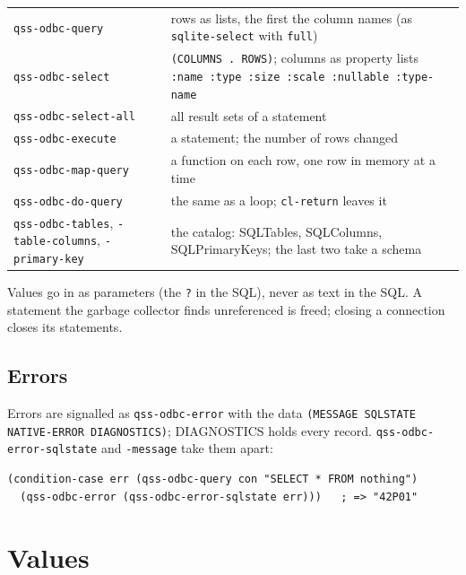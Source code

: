 \documentclass[
  paper=a4, fontsize=11pt, parskip=half, headings=small,
  toc=bibliography, numbers=noenddot, DIV=12
]{scrreprt}
\newcommand{\code}[1]{\texttt{#1}}
\begin{document}
\noindent\begin{tabularx}{\linewidth}{@{}lX@{}}
\toprule
\code{qss-odbc-query} & rows as lists, the first the column names (as \code{sqlite-select} with \code{full}) \\
\code{qss-odbc-select} & \code{(COLUMNS . ROWS)}; columns as property lists \code{:name :type :size :scale :nullable :type-name} \\
\code{qss-odbc-select-all} & all result sets of a statement \\
\code{qss-odbc-execute} & a statement; the number of rows changed \\
\code{qss-odbc-map-query} & a function on each row, one row in memory at a time \\
\code{qss-odbc-do-query} & the same as a loop; \code{cl-return} leaves it \\
\code{qss-odbc-tables}, \code{-table-columns}, \code{-primary-key} & the catalog: SQLTables, SQLColumns, SQLPrimaryKeys; the last two take a schema \\
\bottomrule
\end{tabularx}

\medskip
Values go in as parameters (the \code{?} in the SQL), never as text in the
SQL. A statement the garbage collector finds unreferenced is freed; closing a
connection closes its statements.

\section{Errors}

Errors are signalled as \code{qss-odbc-error} with the data
\code{(MESSAGE SQLSTATE NATIVE-ERROR DIAGNOSTICS)}; DIAGNOSTICS holds every
record. \code{qss-odbc-error-sqlstate} and \code{-message} take them apart:

\begin{lstlisting}
(condition-case err (qss-odbc-query con "SELECT * FROM nothing")
  (qss-odbc-error (qss-odbc-error-sqlstate err)))   ; => "42P01"
\end{lstlisting}

\chapter{Values}
\end{document}
